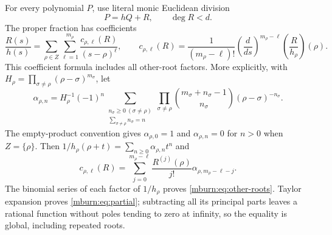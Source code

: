 \documentclass[11pt]{article}
\begin{document}
For every polynomial $P$, use literal monic Euclidean division
\begin{equation}\label{mburn:eq:division}
 P=hQ+R,\qquad \deg R<d.
\end{equation}
The proper fraction has coefficients
\begin{equation}\label{mburn:eq:partial}
 \frac{R(s)}{h(s)}=
 \sum_{\rho\in Z}\sum_{\ell=1}^{m_\rho}
        \frac{c_{\rho,\ell}(R)}{(s-\rho)^\ell},\qquad
 c_{\rho,\ell}(R)=
 \frac{1}{(m_\rho-\ell)!}
 \left(\frac d{ds}\right)^{m_\rho-\ell}
                  \left(\frac R{h_\rho}\right)(\rho).
\end{equation}
This coefficient formula includes all other-root factors. More
explicitly, with $H_\rho=\prod_{\sigma\ne\rho}
(\rho-\sigma)^{m_\sigma}$, let
\begin{equation}\label{mburn:eq:other-roots}
 \alpha_{\rho,n}=H_\rho^{-1}(-1)^n
 \sum_{\substack{n_\sigma\geq0\ (\sigma\ne\rho)\\
                         \sum_{\sigma\ne\rho}n_\sigma=n}}
 \prod_{\sigma\ne\rho}
  \binom{m_\sigma+n_\sigma-1}{n_\sigma}
                    (\rho-\sigma)^{-n_\sigma}.
\end{equation}
The empty-product convention gives $\alpha_{\rho,0}=1$ and
$\alpha_{\rho,n}=0$ for $n>0$ when $Z=\{\rho\}$.
Then $1/h_\rho(\rho+t)=\sum_{n\geq0}\alpha_{\rho,n}t^n$ and
\[
 c_{\rho,\ell}(R)=\sum_{j=0}^{m_\rho-\ell}
       \frac{R^{(j)}(\rho)}{j!}\alpha_{\rho,m_\rho-\ell-j}.
\]
The binomial series of each factor of $1/h_\rho$ proves
\eqref{mburn:eq:other-roots}. Taylor expansion proves
\eqref{mburn:eq:partial}; subtracting all its principal parts leaves
a rational function without poles tending to zero at infinity,
so the equality is global, including repeated roots.
\end{document}
